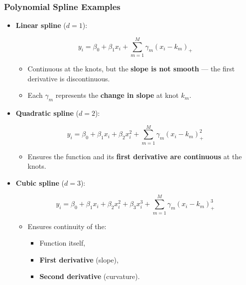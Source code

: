 \documentclass[
  letterpaper,
  DIV=11,
  numbers=noendperiod]{scrreprt}
\providecommand{\tightlist}{%
  \setlength{\itemsep}{0pt}\setlength{\parskip}{0pt}}\usepackage{longtable,booktabs,array}
\begin{document}
\hypertarget{polynomial-spline-examples}{%
\subsubsection*{Polynomial Spline
Examples}\label{polynomial-spline-examples}}

\begin{tcolorbox}[enhanced jigsaw, rightrule=.15mm, breakable, left=2mm, colframe=quarto-callout-tip-color-frame, opacityback=0, leftrule=.75mm, toprule=.15mm, colback=white, arc=.35mm, bottomrule=.15mm]

\begin{itemize}
\item
  \textbf{Linear spline} (\(d = 1\)):

  \[
  y_i = \beta_0 + \beta_1 x_i + \sum_{m=1}^M \gamma_m (x_i - k_m)_{+}
  \]

  \begin{itemize}
  \tightlist
  \item
    Continuous at the knots, but the \textbf{slope is not smooth} ---
    the first derivative is discontinuous.
  \item
    Each \(\gamma_m\) represents the \textbf{change in slope} at knot
    \(k_m\).
  \end{itemize}
\item
  \textbf{Quadratic spline} (\(d = 2\)):

  \[
  y_i = \beta_0 + \beta_1 x_i + \beta_2 x_i^2 + \sum_{m=1}^M \gamma_m (x_i - k_m)^2_{+}
  \]

  \begin{itemize}
  \tightlist
  \item
    Ensures the function and its \textbf{first derivative are
    continuous} at the knots.
  \end{itemize}
\item
  \textbf{Cubic spline} (\(d = 3\)):

  \[
  y_i = \beta_0 + \beta_1 x_i + \beta_2 x_i^2 + \beta_3 x_i^3 + \sum_{m=1}^M \gamma_m (x_i - k_m)^3_{+}
  \]

  \begin{itemize}
  \tightlist
  \item
    Ensures continuity of the:

    \begin{itemize}
    \tightlist
    \item
      Function itself,
    \item
      \textbf{First derivative} (slope),
    \item
      \textbf{Second derivative} (curvature).
    \end{itemize}
  \end{itemize}
\end{itemize}

\end{tcolorbox}
\end{document}
